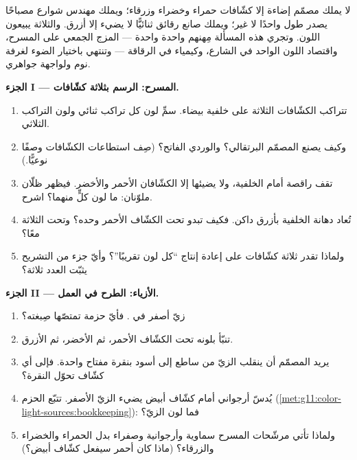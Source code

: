 \begin{problem}
\label{pb:g11:color-light-sources:1}
لا يملك مصمّم إضاءة إلا كشّافات حمراء وخضراء وزرقاء؛ ويملك مهندس
شوارع مصباحًا يصدر طول  واحدًا لا غير؛ ويملك صانع رقائق
ثنائيًّا لا يضيء إلا أزرق. والثلاثة يبيعون اللون. وتجري هذه المسألة
مِهنهم واحدة واحدة --- المزج الجمعي على المسرح، واقتصاد اللون الواحد
في الشارع، وكيمياء  في الرقاقة --- وتنتهي باختيار
الضوء لغرفة نوم ولواجهة جواهري.

\medskip
\noindent\textbf{الجزء I --- المسرح: الرسم بثلاثة كشّافات.}
\begin{enumerate}
  \item تتراكب الكشّافات الثلاثة على خلفية بيضاء. سمِّ لون
        كل تراكب ثنائي ولون التراكب الثلاثي.
  \item وكيف يصنع المصمّم البرتقالي؟ والوردي الفاتح؟ (صِف
        استطاعات الكشّافات وصفًا نوعيًّا.)
  \item تقف راقصة أمام الخلفية، ولا يضيئها إلا الكشّافان
        الأحمر والأخضر. فيظهر ظلّان ملوّنان: ما لون كلٍّ منهما؟ اشرح.
  \item تُعاد دهانة الخلفية بأزرق داكن. فكيف تبدو
        تحت الكشّاف الأحمر وحده؟ وتحت الثلاثة معًا؟
  \item ولماذا تقدر ثلاثة كشّافات على إعادة إنتاج ``كل لون تقريبًا''؟ وأيّ
        جزء من التشريح يثبّت العدد ثلاثة؟
\end{enumerate}

\medskip
\noindent\textbf{الجزء II --- الأزياء: الطرح في العمل.}
\begin{enumerate}[resume]
  \item زيّ أصفر في . فأيّ حزمة تمتصّها
        صِبغته؟
  \item تنبّأ بلونه تحت الكشّاف الأحمر، ثم الأخضر، ثم
        الأزرق.
  \item يريد المصمّم أن ينقلب الزيّ من ساطع إلى أسود بنقرة
        مفتاح واحدة. فإلى أي كشّاف تحوّل النقرة؟
  \item يُدسّ  أرجواني أمام كشّاف أبيض يضيء
        الزيّ الأصفر. تتبّع الحزم
        (\cref{met:g11:color-light-sources:bookkeeping}): فما لون الزيّ؟
  \item ولماذا تأتي مرشّحات المسرح سماوية وأرجوانية وصفراء بدل
        الحمراء والخضراء والزرقاء؟ (ماذا كان  أحمر سيفعل  كشّاف أبيض؟)
\end{enumerate}


\end{problem}
